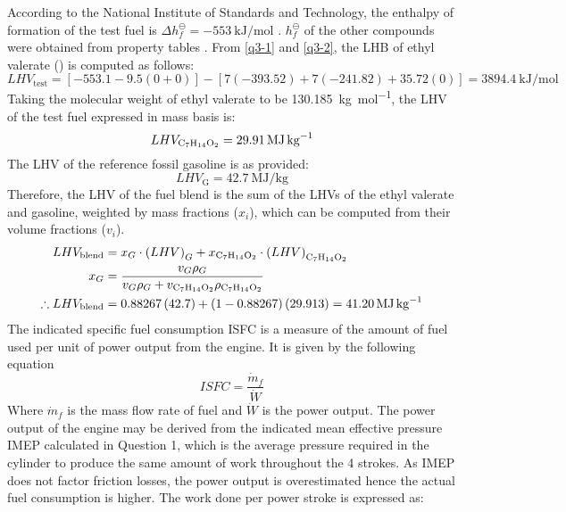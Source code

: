 According to the National Institute of Standards and Technology, the enthalpy of formation of the test fuel is $\Delta h_f^{\ominus} = \SI{-553}{\kilo\joule\per\mol}$ \cite{q3-r3}. $h_f^{\ominus}$ of the other compounds were obtained from property tables \cite{q4-r4}. From \eqref{q3-1} and \eqref{q3-2}, the LHB of ethyl valerate () is computed as follows:
\begin{equation}
    LHV_{\textrm{test}} = \left[-553.1-9.5\left(0+0\right)\right]-\left[7\left(-393.52\right)+7\left(-241.82\right)+35.72\left(0\right)\right] = \SI{3894.4}{\kilo\joule\per\mol}
\end{equation}
Taking the molecular weight of ethyl valerate to be \SI{130.185}{\kilo\gram\per\mole}, the LHV of the test fuel expressed in mass basis is:
\begin{equation}
    LHV_{\ce{C7H14O2}} = \SI{29.91}{\mega\joule\per\kg}
\end{equation}
The LHV of the reference fossil gasoline is as provided:
\begin{equation}
    LHV_{\textrm{G}} = \SI{42.7}{\mega\joule\per\kg}
\end{equation}
Therefore, the LHV of the fuel blend is the sum of the LHVs of the ethyl valerate and gasoline, weighted by mass fractions ($x_i$), which can be computed from their volume fractions ($v_i$). \cite{q3-r1}
\begin{align}
    LHV_{\textrm{blend}}            & = x_G \cdot \left(LHV\right)_G + x_{\ce{C7H14O2}} \cdot \left(LHV\right)_{\ce{C7H14O2}}                 \\
    x_G                             & = \frac{v_G \rho_G}{v_G \rho_G + v_{\ce{C7H14O2}}\rho_{\ce{C7H14O2}}}                                   \\
    \therefore LHV_{\textrm{blend}} & = 0.88267\left(42.7\right) + \left(1-0.88267\right)\left(29.913\right) = \SI{41.20}{\mega\joule\per\kg}
\end{align}
The indicated specific fuel consumption ISFC is a measure of the amount of fuel used per unit of power output from the engine. It is given by the following equation \cite{q3-r5}
\begin{equation}
    ISFC = \frac{\dot{m}_f}{\dot{W}} \label{q3-3}
\end{equation}
Where $\dot{m}_f$ is the mass flow rate of fuel and $\dot{W}$ is the power output. The power output of the engine may be derived from the indicated mean effective pressure IMEP calculated in Question 1, which is the average pressure required in the cylinder to produce the same amount of work throughout the 4 strokes. As IMEP does not factor friction losses, the power output is overestimated hence the actual fuel consumption is higher. The work done per power stroke is expressed as:
